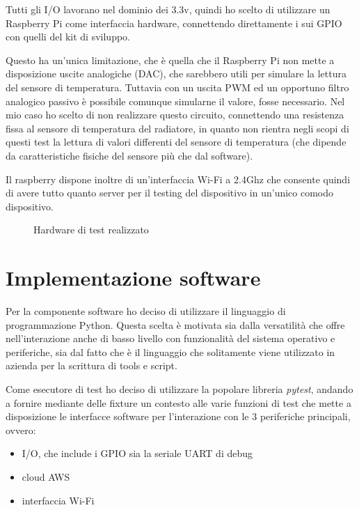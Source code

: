 \documentclass[12pt,a4paper,twoside,titlepage]{book}
\begin{document}
Tutti gli I/O lavorano nel dominio dei 3.3v, quindi ho scelto di utilizzare un
Raspberry Pi come interfaccia hardware, connettendo direttamente i sui GPIO con
quelli del kit di sviluppo.

Questo ha un'unica limitazione, che è quella che il Raspberry Pi non mette a disposizione
uscite analogiche (DAC), che sarebbero utili per simulare la lettura del sensore di
temperatura. Tuttavia con un uscita PWM ed un opportuno filtro analogico passivo è
possibile comunque simularne il valore, fosse necessario. Nel mio caso ho scelto di
non realizzare questo circuito, connettendo una resistenza fissa al sensore di
temperatura del radiatore, in quanto non rientra negli scopi di questi test la lettura
di valori differenti del sensore di temperatura (che dipende da caratteristiche fisiche
del sensore più che dal software).

Il raspberry dispone inoltre di un'interfaccia Wi-Fi a 2.4Ghz che consente quindi di
avere tutto quanto server per il testing del dispositivo in un'unico comodo dispositivo.

\begin{figure}
    \caption{Hardware di test realizzato}
    \label{fig:quadretto}
\end{figure}

\section{Implementazione software}

Per la componente software ho deciso di utilizzare il linguaggio di programmazione
Python. Questa scelta è motivata sia dalla versatilità che offre nell'interazione anche
di basso livello con funzionalità del sistema operativo e periferiche, sia dal fatto
che è il linguaggio che solitamente viene utilizzato in azienda per la scrittura di
tools e script.

Come esecutore di test ho deciso di utilizzare la popolare libreria \textit{pytest},
andando a fornire mediante delle fixture un contesto alle varie funzioni di test che
mette a disposizione le interfacce software per l'interazione con le 3 periferiche
principali, ovvero:

\begin{itemize}
    \item I/O, che include i GPIO sia la seriale UART di debug
    \item cloud AWS
    \item interfaccia Wi-Fi
\end{itemize}
\end{document}
